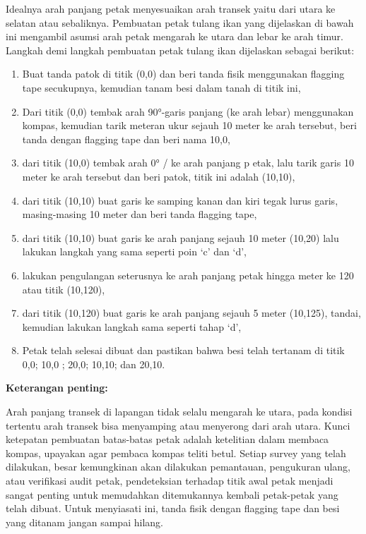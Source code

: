 \documentclass[
]{book}
\begin{document}
Idealnya arah panjang petak menyesuaikan arah transek yaitu dari utara ke selatan atau sebaliknya. Pembuatan petak tulang ikan yang dijelaskan di bawah ini mengambil asumsi arah petak mengarah ke utara dan lebar ke arah timur. Langkah demi langkah pembuatan petak tulang ikan dijelaskan sebagai berikut:

\begin{enumerate}
\def\labelenumi{\alph{enumi})}
\item
  Buat tanda patok di titik (0,0) dan beri tanda fisik menggunakan flagging tape secukupnya, kemudian tanam besi dalam tanah di titik ini,
\item
  Dari titik (0,0) tembak arah 90°-garis panjang (ke arah lebar) menggunakan kompas, kemudian tarik meteran ukur sejauh 10 meter ke arah tersebut, beri tanda dengan flagging tape dan beri nama 10,0,
\item
  dari titik (10,0) tembak arah 0° / ke arah panjang p etak, lalu tarik garis 10 meter ke arah tersebut dan beri patok, titik ini adalah (10,10),
\item
  dari titik (10,10) buat garis ke samping kanan dan kiri tegak lurus garis, masing-masing 10 meter dan beri tanda flagging tape,
\item
  dari titik (10,10) buat garis ke arah panjang sejauh 10 meter (10,20) lalu lakukan langkah yang sama seperti poin `c' dan `d',
\item
  lakukan pengulangan seterusnya ke arah panjang petak hingga meter ke 120 atau titik (10,120),
\item
  dari titik (10,120) buat garis ke arah panjang sejauh 5 meter (10,125), tandai, kemudian lakukan langkah sama seperti tahap `d',
\item
  Petak telah selesai dibuat dan pastikan bahwa besi telah tertanam di titik 0,0; 10,0 ; 20,0; 10,10; dan 20,10.
\end{enumerate}

\textbf{Keterangan penting:}

Arah panjang transek di lapangan tidak selalu mengarah ke utara, pada kondisi tertentu arah transek bisa menyamping atau menyerong dari arah utara. Kunci ketepatan pembuatan batas-batas petak adalah ketelitian dalam membaca kompas, upayakan agar pembaca kompas teliti betul. Setiap survey yang telah dilakukan, besar kemungkinan akan dilakukan pemantauan, pengukuran ulang, atau verifikasi audit petak, pendeteksian terhadap titik awal petak menjadi sangat penting untuk memudahkan ditemukannya kembali petak-petak yang telah dibuat. Untuk menyiasati ini, tanda fisik dengan flagging tape dan besi yang ditanam jangan sampai hilang.
\end{document}
